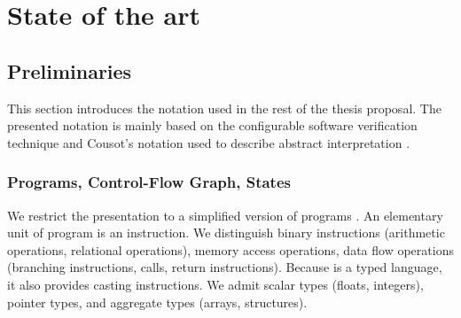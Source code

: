 \chapter{State of the art}
\label{ch:state}



%
%


\section{Preliminaries}
\label{sec:preliminaries}

This section introduces the notation used in the rest of the thesis proposal.
The presented notation is mainly based on the configurable software
verification technique \cite{Beyer2007, Beyer2018, Beyer2018b} and Cousot's
notation used to describe abstract interpretation \cite{Cousot2012}.

\subsection{Programs, Control-Flow Graph, States}

We restrict the presentation to a simplified version of \llvm programs
\cite{Lattner04}. An elementary unit of \llvm program is an instruction. We
distinguish binary instructions (arithmetic operations, relational operations),
memory access operations, data flow operations (branching instructions, calls,
return instructions). Because \llvmir is a typed language, it also provides
casting instructions. We admit scalar types (floats, integers), pointer types,
and aggregate types (arrays, structures).

